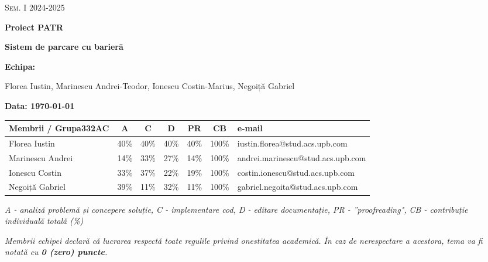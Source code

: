 \documentclass[a4paper,11pt]{report}
\begin{document}
\begin{titlepage}
    \centering
    {\scshape\Large Sem. I 2024-2025 \par}
    \vspace{6cm}
    \flushleft
    {\huge\bfseries Proiect PATR\par}
    {\LARGE\bfseries Sistem de parcare cu barieră\par}
    \vspace{2cm}
    {\LARGE\bfseries Echipa: \par}
    {\large Florea Iustin, Marinescu Andrei-Teodor, Ionescu Costin-Marius, Negoiță Gabriel}
    
    {\LARGE\bfseries Data: \today \par} 
    \vspace{2.5cm}


    \begin{table}[h]
        \small
        \centering
        \begin{tabular}{|l|c|c|c|c|c|p{5.5cm}|}
        \hline
        Membrii  /  Grupa332AC       & A          & C          & D          & PR         & CB         & e-mail                    \\ \hline
        Florea Iustin  & 40\%       & 40\%       & 40\%       & 40\%       & 100\%      & iustin.florea@stud.acs.upb.com          \\ \hline
        Marinescu Andrei               & 14\%       & 33\%       & 27\%       & 14\%       & 100\%      & andrei.marinescu@stud.acs.upb.com          \\ \hline
        Ionescu Costin               & 33\%       & 37\%       & 22\%       & 19\%       & 100\%      & costin.ionescu@stud.acs.upb.com          \\ \hline
        Negoiță Gabriel               & 39\%       & 11\%       & 32\%       & 11\%       & 100\%      & gabriel.negoita@stud.acs.upb.com          \\ \hline
        \end{tabular}
    \end{table}

    \textit{A - analiză problemă și concepere soluție, C - implementare cod, D - editare documentație, PR - ''proofreading", CB - contribuție individuală totală (\%)}\\
    \vspace{1cm}  
    {\large {\itshape Membrii echipei declară că lucrarea respectă toate regulile privind onestitatea academică. În caz de nerespectare a acestora, tema va fi notată cu \textbf{0 (zero) puncte}. }  \par}
\end{titlepage}
\end{document}

